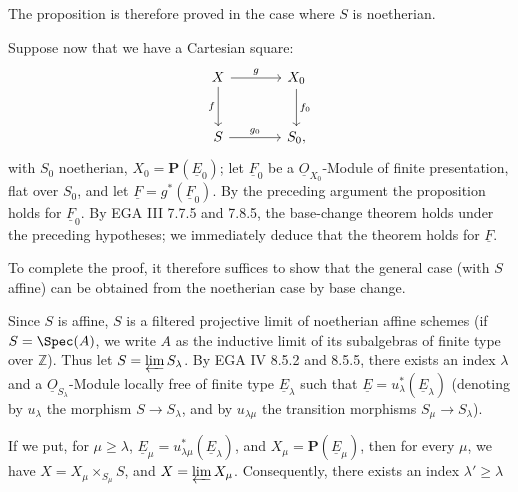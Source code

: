 The proposition is therefore proved in the case where \(S\) is noetherian.

Suppose now that we have a Cartesian square:
\[
\begin{tikzcd}[column sep=large,row sep=large]
X \arrow[r,"g"] \arrow[d,"f"'] & X_0 \arrow[d,"f_0"]\\
S \arrow[r,"g_0"] & S_0,
\end{tikzcd}
\]
with \(S_0\) noetherian, \(X_0=\mathbf P(\underline{E}_0)\); let \(\underline{F}_0\) be a \(\underline{O}_{X_0}\)-Module of finite presentation, flat over \(S_0\), and let \(\underline{F}=g^*(\underline{F}_0)\). By the preceding argument the proposition holds for \(\underline{F}_0\). By EGA III 7.7.5 and 7.8.5, the base-change theorem holds under the preceding hypotheses; we immediately deduce that the theorem holds for \(\underline{F}\).

To complete the proof, it therefore suffices to show that the general case (with \(S\) affine) can be obtained from the noetherian case by base change.

Since \(S\) is affine, \(S\) is a filtered projective limit of noetherian affine schemes (if \(S=\Spec(A)\), we write \(A\) as the inductive limit of its subalgebras of finite type over \(\mathbb Z\)). Thus let \(S=\varprojlim S_\lambda\). By EGA IV 8.5.2 and 8.5.5, there exists an index \(\lambda\) and a \(\underline{O}_{S_\lambda}\)-Module locally free of finite type \(\underline{E}_\lambda\) such that \(\underline{E}=u_\lambda^*(\underline{E}_\lambda)\) (denoting by \(u_\lambda\) the morphism \(S\to S_\lambda\), and by \(u_{\lambda\mu}\) the transition morphisms \(S_\mu\to S_\lambda\)).

If we put, for \(\mu\geq\lambda\), \(\underline{E}_\mu=u_{\lambda\mu}^*(\underline{E}_\lambda)\), and \(X_\mu=\mathbf P(\underline{E}_\mu)\), then for every \(\mu\), we have \(X=X_\mu\times_{S_\mu}S\), and \(X=\varprojlim X_\mu\). Consequently, there exists an index \(\lambda'\geq\lambda\)
